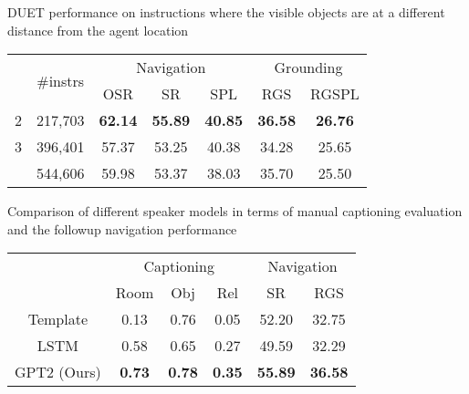 \begin{minipage}[t]{\linewidth}
\begin{minipage}[t]{0.45\linewidth}
\makeatletter{}
\tabcolsep=0.05cm
\scriptsize
\caption{DUET performance on instructions where the visible objects are at a different distance  from the agent location}
\label{tab:rvr_depth_obj_filter}
\begin{tabular}{ccccccc} \toprule
\multirow{2}{*}{} & \multirow{2}{*}{\#instrs} & \multicolumn{3}{c}{Navigation} & \multicolumn{2}{c}{Grounding} \\
&  & OSR & SR & SPL & RGS & RGSPL \\ \midrule
    2 & 217,703 &\textbf{62.14} & \textbf{55.89} & \textbf{40.85} & \textbf{36.58} & \textbf{26.76} \\
    3 & 396,401 & 57.37 & 53.25 & 40.38 & 34.28 & 25.65 \\ 
     & 544,606 & 59.98 & 53.37 & 38.03 & 35.70 & 25.50 \\ \bottomrule
\end{tabular}
\end{minipage}
\quad
\begin{minipage}[t]{0.48\linewidth}
\makeatletter{}
\tabcolsep=0.05cm
\scriptsize
\centering
\caption{Comparison of different speaker models in terms of manual captioning evaluation and the followup navigation performance}
\label{tab:instr_eval}
\begin{tabular}{cccccc} \toprule
 & \multicolumn{3}{c}{Captioning} & \multicolumn{2}{c}{Navigation} \\
 & Room & Obj & Rel & SR & RGS \\ \midrule
Template & 0.13 & 0.76 & 0.05 & 52.20 & 32.75 \\
LSTM & 0.58 & 0.65 & 0.27 & 49.59 & 32.29 \\
GPT2 (Ours) & \textbf{0.73} & \textbf{0.78} & \textbf{0.35} & \textbf{55.89} & \textbf{36.58} \\ \bottomrule
\end{tabular}
\end{minipage}
\end{minipage}



